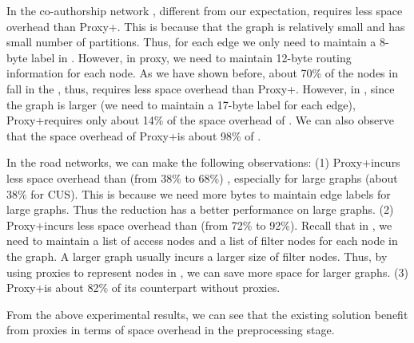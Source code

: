 In the co-authorship network \dblpone, different from our expectation, \arcflag requires less space overhead than Proxy+\arcflag. This is because that the graph is relatively small and has small number of partitions. Thus, for each edge we only need to maintain a 8-byte label in \arcflag. However, in proxy, we need to maintain 12-byte routing information for each node. As we have shown before, about 70\% of the nodes in \dblpone fall in the \dras, thus, \arcflag requires less space overhead than Proxy+\arcflag. However, in \dblp, since the graph is larger (we need to maintain a 17-byte label for each edge), Proxy+\arcflag requires only about 14\% of the space overhead of \arcflag. We can also observe that the space overhead of Proxy+\tnr is about 98\% of \tnr.

In the road networks, we can make the following observations: (1) Proxy+\arcflag incurs less space overhead than \arcflag (from 38\% to 68\%) , especially for large graphs (about 38\% for CUS). This is because we need more bytes to maintain edge labels for large graphs. Thus the reduction has a better performance on large graphs. (2) Proxy+\tnr incurs less space overhead than \tnr (from 72\% to 92\%). Recall that in \tnr, we need to maintain a list of access nodes and a list of filter nodes for each node in the graph. A larger graph usually incurs a larger size of filter nodes. Thus, by using proxies to represent nodes in \dras, we can save more space for larger graphs. (3) Proxy+\ah is about 82\% of its counterpart without proxies.

From the above experimental results, we can see that the existing solution benefit from proxies in terms of space overhead in the preprocessing stage.




















